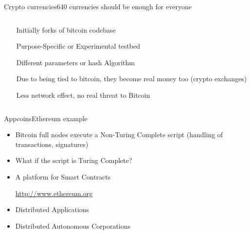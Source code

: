 \documentclass[english,compress]{beamer}
\begin{document}

\begin{frame}{Crypto currencies}{640 currencies should be enough for everyone}
 \begin{columns}
  \begin{column}{0.5 \textwidth}
  \end{column}
  
 \begin{column}{0.4 \textwidth}
\begin{itemize}
\begin{small}   
    \item Initially forks of bitcoin codebase
    \item Purpose-Specific or Experimental testbed
    \item Different parameters or hash Algorithm
    \item Due to being tied to bitcoin, they become real money too (crypto exchanges)
    \item Less network effect, no real threat to Bitcoin
\end{small}
   \end{itemize}
  \end{column}
  \hfill
  \end{columns}
\end{frame}

\begin{frame}{Appcoins}{Ethereum example}
\begin{itemize}
 
 \item Bitcoin full nodes execute a Non-Turing Complete script (handling of transactions, signatures)
 \item What if the script is Turing Complete?
 \item A platform for Smart Contracts \begin{scriptsize}\url{http://www.ethereum.org}\end{scriptsize}
 \item Distributed Applications
 \item Distributed Autonomous Corporations
 \end{itemize}

 
\end{frame}
\end{document}
